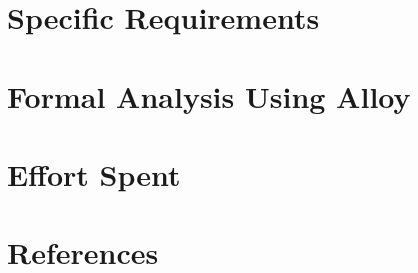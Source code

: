 \documentclass{ConfigurationFiles/Politecnico_Di_Milano}
\begin{document}
    \chapter{Specific Requirements}
    \label{ch:specific_requirements}%
    

    \chapter{Formal Analysis Using Alloy}
    \label{ch:formal_analysis_using_alloy}%
    


    \chapter{Effort Spent}
    \label{ch:effort_spent}%
    


    \chapter{References}
    \label{ch:references}%
    

    \listoffigures

    \listoftables
    \cleardoublepage
\end{document}
